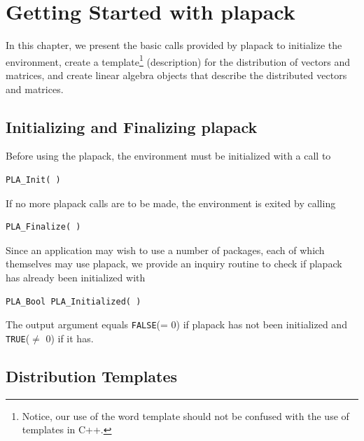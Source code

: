 \chapter{Getting Started with plapack}
\label{chapter:getstart}


In this chapter, we present the basic calls provided by
plapack to initialize the environment, create a template\footnote{
Notice, our use of the word template should not be confused with
the use of templates in C++.}
(description) for the distribution of vectors and matrices,
and create linear algebra objects that describe the
distributed vectors and matrices.


\section{Initializing and Finalizing plapack}

Before using the plapack, the environment must be initialized with a call to
\begin{FlaSpec}
\begin{verbatim}
PLA_Init( )
\end{verbatim}
\end{FlaSpec}
If no more plapack calls are to be made, the environment is exited by calling
\begin{FlaSpec}
\begin{verbatim}
PLA_Finalize( )
\end{verbatim}
\end{FlaSpec}
Since an application may wish to use a number of packages,
each of which themselves may use plapack, we provide an inquiry
routine to check if plapack has already been initialized with
\begin{FlaSpec}
\begin{verbatim}
PLA_Bool PLA_Initialized( )
\end{verbatim}
\end{FlaSpec}
The output argument equals {\tt FALSE}(= 0) if plapack has not been 
initialized and {\tt TRUE}($\neq$ 0) if it has.


\section{Distribution Templates}

